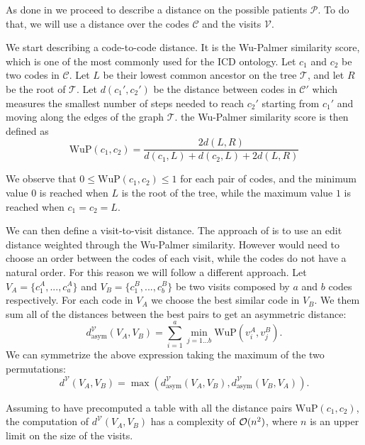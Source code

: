 \documentclass[]{marticle}
\newcommand{\codes}{\mathcal{C}}
\newcommand{\tree }{\mathcal{T}}
\newcommand{\patients}{\mathcal{P}}
\newcommand{\visits}{\mathcal{V}}
\begin{document}
As done in \cite{panigutti-xai} we proceed to describe a distance on the possible patients $\patients$. To
do that, we will use a distance over the codes $\codes$ and the visits $\visits$.

We start describing a code-to-code distance. It is the Wu-Palmer similarity score, which is one of
the most commonly used for the ICD ontology. Let $c_1$ and $c_2$ be two codes in $\codes$. Let $L$
be their lowest common ancestor on the tree $\tree$, and let $R$ be the root of $\tree$. Let $d(c_1',
c_2')$ be the distance between codes in $\codes'$ which measures the smallest number of steps needed
to reach $c_2'$ starting from $c_1'$ and moving along the edges of the graph $\tree$. the Wu-Palmer
similarity score is then defined as
$$ \text{WuP}(c_1, c_2) = \frac{2 d(L,R)}{d(c_1,L) + d(c_2, L) + 2d(L,R)} $$

We observe that $0 \leq \text{WuP}(c_1, c_2) \leq 1$ for each pair of codes, and the minimum value $0$ is
reached when $L$ is the root of the tree, while the maximum value $1$ is reached when $c_1 = c_2 =
L$.

We can then define a visit-to-visit distance. The approach of \cite{panigutti-xai} is to use an edit
distance weighted through the Wu-Palmer similarity. However would need to choose an order between
the codes of each visit, while the codes do not have a natural order. For this reason we will follow
a different approach. Let $V_A = \{c^A_1, ..., c^A_a\}$ and $V_B = \{c^B_1,..., c^B_b\}$ be two visits
composed by $a$ and $b$ codes respectively. For each code in $V_A$ we choose the best similar code
in $V_B$. We them sum all of the distances between the best pairs to get an asymmetric distance:
$$ d^\visits _\text{asym} (V_A, V_B) = \sum_{i=1}^a \min_{j=1...b} \text{WuP}(v^A_i, v^B_j). $$
We can symmetrize the above expression taking the maximum of the two permutations:
$$ d^\visits  (V_A, V_B) = \max(d^\visits _\text{asym} (V_A, V_B), d^\visits _\text{asym} (V_B, V_A)). $$

Assuming to have precomputed a table with all the distance pairs $\text{WuP}(c_1, c_2)$, the computation
of $d^\visits (V_A, V_B)$ has a complexity of $\mathcal{O}(n^2)$, where $n$ is an upper limit on the
size of the visits.
\end{document}
